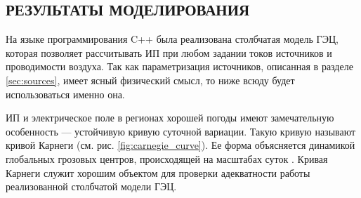 \subsection{РЕЗУЛЬТАТЫ МОДЕЛИРОВАНИЯ}

На языке программирования C++ была реализована столбчатая модель ГЭЦ, которая позволяет рассчитывать ИП при любом задании токов источников и проводимости воздуха. Так как параметризация источников, описанная в разделе \ref{sec:sources}, имеет ясный физический смысл, то ниже всюду будет использоваться именно она.

ИП и электрическое поле в регионах хорошей погоды имеют замечательную особенность --- устойчивую кривую суточной вариации. Такую кривую называют кривой Карнеги \cite{Harrison_2012} (см. рис. \ref{fig:carnegie_curve}). Ее форма объясняется динамикой глобальных грозовых центров, происходящей на масштабах суток \cite{Ilin_et_al_2020}. Кривая Карнеги служит хорошим объектом для проверки адекватности работы реализованной столбчатой модели ГЭЦ. 

